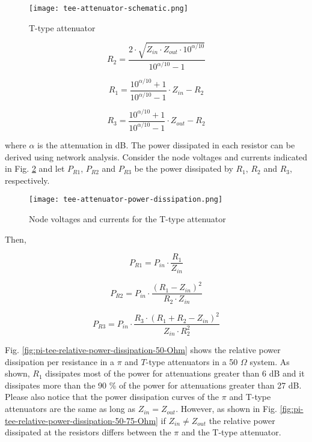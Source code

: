 \begin{figure}[ht]
    \centering
    \texttt{[image: tee-attenuator-schematic.png]}
    \caption{T-type attenuator}
    \label{fig:tee-type-attenuator-schematic}
\end{figure}

\begin{equation}
    R_{2} = \frac{2 \cdot \sqrt{Z_{in} \cdot Z_{out} \cdot 10^{\alpha/10}}}{10^{\alpha/10}-1}
\end{equation}

\begin{equation}
    R_{1} = \frac{10^{\alpha/10} + 1}{10^{\alpha/10} - 1} \cdot Z_{in} - R_2
\end{equation}

\begin{equation}
    R_{3} = \frac{10^{\alpha/10} + 1}{10^{\alpha/10} - 1} \cdot Z_{out} - R_2
\end{equation}


\noindent where $\alpha$ is the attenuation in dB. The power dissipated in each resistor can be derived using network analysis. Consider the node voltages and currents indicated in Fig. \ref{fig:power-dissipation-tee-type-attenuator} and let $P_{R1}$, $P_{R2}$ and $P_{R3}$ be the power dissipated by $R_1$, $R_2$ and $R_3$, respectively.

\begin{figure}[ht]
    \centering
    \texttt{[image: tee-attenuator-power-dissipation.png]}
    \caption{Node voltages and currents for the T-type attenuator}
    \label{fig:power-dissipation-tee-type-attenuator}
\end{figure}

\noindent Then,

\begin{equation}
    P_{R1} = P_{in} \cdot \frac{R_1}{Z_{in}}
\end{equation}

\begin{equation}
    P_{R2} = P_{in} \cdot  \frac{(R_1 - Z_{in})^2}{R_2 \cdot Z_{in}}
\end{equation}

\begin{equation}
    P_{R3} = P_{in} \cdot \frac{R_3 \cdot (R_1 + R_2 - Z_{in})^2}{Z_{in} \cdot R_2^2}
\end{equation}


\noindent Fig. \ref{fig:pi-tee-relative-power-dissipation-50-Ohm} shows the relative power dissipation per resistance in a $\pi$ and $T$-type attenuators in a 50 $\Omega$ system. As shown, $R_1$ dissipates most of the power for attenuations greater than 6 dB and it dissipates more than the 90 \% of the power for attenuations greater than 27 dB. Please also notice that the power dissipation curves of the $\pi$ and T-type attenuators are the same as long as $Z_{in} = Z_{out}$. However, as shown in Fig. \ref{fig:pi-tee-relative-power-dissipation-50-75-Ohm} if $Z_{in} \neq Z_{out}$ the relative power dissipated at the resistors differs between the $\pi$ and the T-type attenuator.

